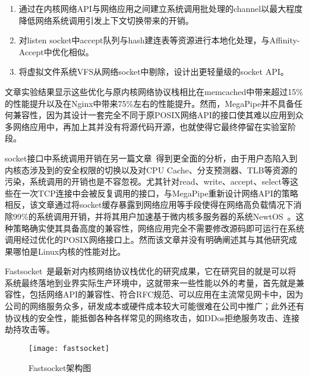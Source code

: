 \begin{enumerate}[(1),labelsep=.5em, leftmargin = 0pt, itemindent = 3em]
\item 通过在内核网络API与网络应用之间建立系统调用批处理的channel以最大程度降低网络系统调用引发上下文切换带来的开销。
\item 对listen socket中accept队列与hash建连表等资源进行本地化处理，与Affinity-Accept中优化相似。
\item 将虚拟文件系统VFS从网络socket中剔除，设计出更轻量级的socket API。
\end{enumerate}

文章实验结果显示这些优化与原内核网络协议栈相比在memcached中带来超过15\%的性能提升以及在Nginx中带来75\%左右的性能提升。然而，MegaPipe并不具备任何兼容性，因为其设计一套完全不同于原POSIX网络API的接口使其难以应用到众多网络应用中，再加上其并没有将源代码开源，也就使得它最终停留在实验室阶段。

socket接口中系统调用开销在另一篇文章~\cite{hruby2014sockets}得到更全面的分析，由于用户态陷入到内核态涉及到的安全权限的切换以及对CPU Cache、分支预测器、TLB等资源的污染，系统调用的开销也是不容忽视。尤其针对read、write、accept、select等这些在一次TCP连接中会被反复调用的接口，与MegaPipe重新设计网络API的策略相反，该文章通过将socket缓存暴露到网络应用等手段使得在网络高负载情况下消除99\%的系统调用开销，并将其用户加速基于微内核多服务器的系统NewtOS~\cite{hruby2012keep}。这种策略确实使其具备高度的兼容性，网络应用完全不需要修改源码即可运行在系统调用经过优化的POSIX网络接口上。然而该文章并没有明确阐述其与其他研究成果哪怕是Linux内核的性能对比。

Fastsocket~\cite{fastsocket,fastsocket-release}是最新对内核网络协议栈优化的研究成果，它在研究目的就是可以将系统最终落地到业界实际生产环境中，这就带来一些性能以外的考量，首先就是兼容性，包括网络API的兼容性、符合RFC规范、可以应用在主流常见网卡中，因为公司的网络服务众多，研发成本或硬件成本较大可能很难在公司中推广；此外还有协议栈的安全性，能抵御各种各样常见的网络攻击，如DDos拒绝服务攻击、连接劫持攻击等。

\vspace{-10pt}
\begin{figure}[H] %
  \centering
  \texttt{[image: fastsocket]}
  \caption{Fastsocket架构图}
  \label{fig:fastsocket}
\end{figure}
\vspace{-10pt}

